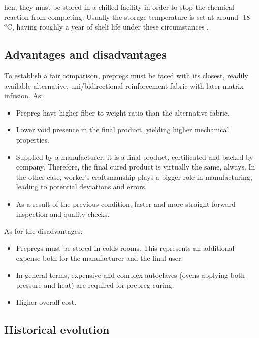 hen, they must be stored in a chilled facility in order to stop the chemical
reaction from completing. Usually the storage temperature is set at around -18 ºC,
having roughly a year of shelf life under these circumstances \cite{https://www.sciencedirect.com/science/article/pii/S2212827117311800}.\\

\subsection{Advantages and disadvantages}

To establish a fair comparison, prepregs must be faced with its closest, readily
available alternative, uni/bidirectional reinforcement fabric with later matrix
infusion. As:\\

\begin{itemize}
	\item Prepreg have higher fiber to weight ratio than the alternative fabric.
	\item Lower void presence in the final product, yielding higher mechanical properties.
	\item Supplied by a manufacturer, it is a final product, certificated and
	backed by company. Therefore, the final cured product is virtually the same,
	always. In the other case, worker’s craftsmanship plays a bigger role in
	manufacturing, leading to potential deviations and errors.
	\item As a result of the previous condition, faster and more straight
	forward inspection and quality checks.
\end{itemize}

As for the disadvantages:

\begin{itemize}
	\item Prepregs must be stored in colds rooms. This represents an additional
	expense both for the manufacturer and the final user.
	\item In general terms, expensive and complex autoclaves (ovens applying
	both pressure and heat) are required for prepreg curing.
	\item Higher overall cost.
\end{itemize}

\subsection{Historical evolution}

